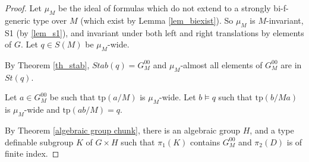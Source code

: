 \documentclass[12pt]{article}
\theoremstyle{definition}
\theoremstyle{mystyle}
\theoremstyle{remark}
\newtheorem*{claim}{Claim}
\newenvironment{claimproof}
    {\begin{proof}}{\renewcommand\qedsymbol{\Squarepipe} \end{proof}}
\newcommand{\acl}{\mathrm{acl}}
\newcommand{\tp}{\mathrm{tp}}
\begin{document}
\begin{proof}
Let  $\mu_M$ be the ideal of formulas which do not extend to a
strongly bi-f-generic type over $M$ (which exist by Lemma
\ref{lem_biexist}). So $\mu_M$ is $M$-invariant, S1 (by
\ref{lem_s1}),  and invariant under both left and right
translations by elements of $G$. Let $q\in S(M)$ be $\mu_M$-wide.


By Theorem \ref{th_stab}, $Stab(q) = G^{00}_M$ and $\mu_M$-almost all elements of $G^{00}_M$ are in $St(q)$.

Let $a\in G^{00}_M$ be such that $\tp(a/M)$ is $\mu_M$-wide. Let $b\models q$ such that $\tp(b/Ma)$ is $\mu_M$-wide and $\tp(ab/M)=q$.

By Theorem \ref{algebraic group chunk}, there is an algebraic
group $H$, and a type definable subgroup $K$ of $G\times H$ such
that $\pi_1(K)$ contains $G^{00}_M$ and $\pi_2(D)$ is of finite
index.

\begin{comment}
We define an ideal $\mu$ on $G \times H$, by saying that $D\in \mu$ if and only if $\pi_1(D)\in \mu_M$. Then $\mu$ is $M$-invariant and invariant under left and right translations. We will refer to $\mu$-wide as ``wide''.

We define the ideal $\lambda$ (that will define ``medium'' in Section
\ref{SStabilizer}) as the set of subsets $X$ of $G\times H$ for which the
projections to $G$ and $H$ each have finite fibers. Note that $\mu$ is S1 on medium types. Define
$\widetilde{p}= \tp(a,a'/M)$. Then $\widetilde{p}$ is wide and
medium. We will show that Theorem \ref{th_stabilizer} can be
applied to the type $\widetilde{p}$.

\begin{claim}
Condition (A) holds: If $p,q$ are two types in $G\times H$ and we have $(g,h)\models p\times_{nf} q$ such that either $\tp(gh/M)$ or $\tp(hg/M)$ is medium, then $p$ is medium.
\end{claim}

\begin{claimproof} Denote $g=(g_0,g_1)$ and same for $h$. We will prove the case where we assume that $\tp(gh/M)$ is medium, the other case is proved in an analogous way. Since $g_0h_0 \in \acl(Mg_1h_1)$ we have $g_0 \in \acl(Mg_1h_0h_1)$. As $\tp(h_0h_1/Mg_0g_1)$ does not fork over $M$, this implies that $g_0 \in \acl(Mg_1)$. In the same way we get $g_1 \in \acl(Mg_0)$.
 \end{claimproof}

By Lemma \ref{lem_stqr}, condition (B) holds.
As $T_{prc}$ is $NTP_2$, condition (F) holds. We can then apply Theorem \ref{th_stabilizer}, which gives us a connected,  medium, wide type-definable group $K\leq G\times H$. As $K$ is medium, its projections to $G$ and $H$ have finite fibers.
As $K$ is wide, $\pi_1(K)$ is $\mu_M$-wide and hence by connectedness $\pi_1(K)=G^{00}_M$.


\end{comment}
\end{proof}
\end{document}
